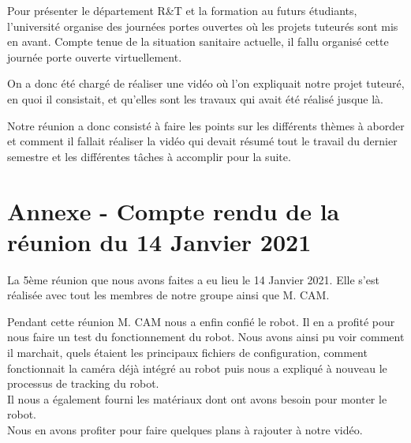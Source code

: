\documentclass{PackagerQualityN}
\begin{document}
Pour présenter le département R\&T et la formation au futurs étudiants, l'université organise des journées portes ouvertes où les projets tuteurés sont mis en avant. Compte tenue de la situation sanitaire actuelle, il fallu organisé cette journée porte ouverte virtuellement.

On a donc été chargé de réaliser une vidéo où l'on expliquait notre projet tuteuré, en quoi il consistait, et qu'elles sont les travaux qui avait été réalisé jusque là.

Notre réunion a donc consisté à faire les points sur les différents thèmes à aborder et comment il fallait réaliser la vidéo qui devait résumé tout le travail du dernier semestre et les différentes tâches à accomplir pour la suite.


\newp
\section{Annexe - Compte rendu de la réunion du 14 Janvier 2021}
La 5ème réunion que nous avons faites a eu lieu le 14 Janvier 2021. Elle s'est réalisée avec tout les membres de notre groupe ainsi que M. CAM.


Pendant cette réunion M. CAM nous a enfin confié le robot. Il en a profité pour nous faire un test du fonctionnement du robot. Nous avons ainsi pu voir comment il marchait, quels étaient les principaux fichiers de configuration, comment fonctionnait la caméra déjà intégré au robot puis nous a expliqué à nouveau le processus de tracking du robot.
\\

Il nous a également fourni les matériaux dont ont avons besoin pour monter le robot.
\\

Nous en avons profiter pour faire quelques plans à rajouter à notre vidéo.

\newp       %



\end{document}
